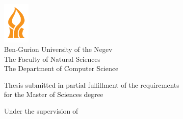 \begin{titlepage}
    \begin{center}
        \doublespacing

        \vspace*{1cm}
        
        \includegraphics[width=0.1\textwidth]{01Cover/Images/bgu.png}\\
        Ben-Gurion University of the Negev\\
        The Faculty of Natural Sciences\\
        The Department of Computer Science
        
        \vspace{2cm}
        
        {\Large \thesistitle}
        
        \vspace{1cm}
        
        Thesis submitted in partial fulfillment of the requirements\\for the Master of Sciences degree
        
        \vspace{1cm}
        
        \thesisauthorname
        
        \vspace{1cm}
        
        Under the supervision of \thesissupervisername
        
        \vfill
        
        \thesismonth \quad \thesisyear

    \end{center}
\end{titlepage}
